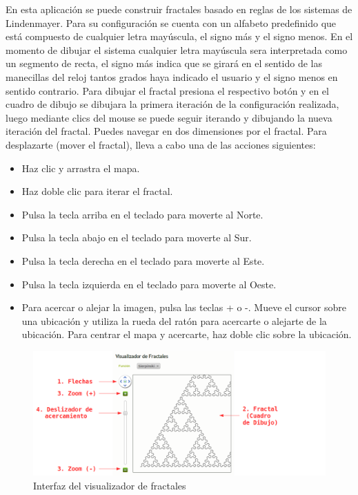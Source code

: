 \documentclass[letterpaper, 11pt, oneside]{article}
\theoremstyle{definition}
\theoremstyle{remark}
\begin{document}
En esta aplicación se puede construir fractales basado en reglas de los sistemas de Lindenmayer. Para su configuración se cuenta con un alfabeto predefinido que está compuesto de cualquier letra mayúscula, el signo más y el signo menos. En el momento de dibujar el sistema cualquier letra mayúscula sera interpretada como un segmento de recta, el signo más indica que se girará en el sentido de las manecillas del reloj tantos grados haya indicado el usuario y el signo menos en sentido contrario. Para dibujar el fractal presiona el respectivo botón y en el cuadro de dibujo se dibujara la primera iteración de la configuración realizada, luego mediante clics del mouse se puede seguir iterando y dibujando la nueva iteración del fractal.
Puedes navegar en dos dimensiones por el fractal. Para desplazarte (mover el fractal), lleva a cabo una de las acciones siguientes:
\begin{itemize}
\item Haz clic y arrastra el mapa.
\item Haz doble clic para iterar el fractal.
\item Pulsa la tecla arriba en el teclado para moverte al Norte.
\item Pulsa la tecla abajo en el teclado para moverte al Sur.
\item Pulsa la tecla derecha en el teclado para moverte al Este.
\item Pulsa la tecla izquierda en el teclado para moverte al Oeste.
\item Para acercar o alejar la imagen, pulsa las teclas + o -. Mueve el cursor sobre una ubicación y utiliza la rueda del ratón para acercarte o alejarte de la ubicación. Para centrar el mapa y acercarte, haz doble clic sobre la ubicación.
\end{itemize}

\begin{figure}[h]
\begin{center}
\includegraphics[width=16.5cm,clip]{Imagenes/visualizador.png}
\end{center}
\caption{Interfaz del visualizador de fractales}
\label{visualizador}
\end{figure}
\end{document}
